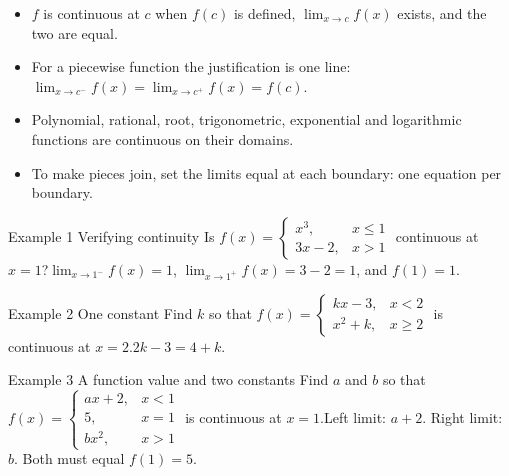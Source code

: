 \documentclass[11pt]{article}
\begin{document}

\begin{ideabox}
\begin{itemize}[leftmargin=*,itemsep=2pt,topsep=2pt]
  \item $f$ is continuous at $c$ when $f(c)$ is defined, $\displaystyle\lim_{x\to c}f(x)$ exists, and the two are equal.
  \item For a piecewise function the justification is one line: $\displaystyle\lim_{x\to c^-}f(x)=\displaystyle\lim_{x\to c^+}f(x)=f(c)$.
  \item Polynomial, rational, root, trigonometric, exponential and logarithmic functions are continuous on their domains.
  \item To make pieces join, set the limits equal at each boundary: one equation per boundary.
\end{itemize}
\end{ideabox}

\begin{example}{Example 1 \textperiodcentered{} Verifying continuity}
Is $f(x)=\begin{cases}x^3,&x\le1\\3x-2,&x>1\end{cases}$ continuous at $x=1$?\soln $\displaystyle\lim_{x\to 1^-}f(x)=1$, $\displaystyle\lim_{x\to 1^+}f(x)=3-2=1$, and $f(1)=1$.
\end{example}

\begin{example}{Example 2 \textperiodcentered{} One constant}
Find $k$ so that $f(x)=\begin{cases}kx-3,&x<2\\x^2+k,&x\ge2\end{cases}$ is continuous at $x=2$.\soln $2k-3=4+k$.
\end{example}

\begin{example}{Example 3 \textperiodcentered{} A function value and two constants}
Find $a$ and $b$ so that $f(x)=\begin{cases}ax+2,&x<1\\5,&x=1\\bx^2,&x>1\end{cases}$ is continuous at $x=1$.\soln Left limit: $a+2$. Right limit: $b$. Both must equal $f(1)=5$.
\end{example}
\end{document}

